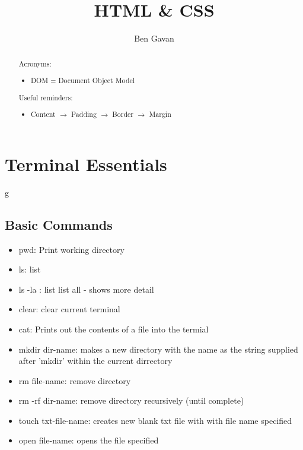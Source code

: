 \documentclass[]{article}
\title{HTML \& CSS}
\author{Ben Gavan}
\newcommand{\<}{\guilsinglleft}
\renewcommand{\>}{\guilsinglright}
\begin{document}
\maketitle

\tableofcontents

\begin{abstract}
Acronyms:
\begin{itemize}
	\item DOM = Document Object Model
\end{itemize} 
Useful reminders:
\begin{itemize}
	\item Content $\rightarrow$ Padding $\rightarrow$ Border $\rightarrow$ Margin 
\end{itemize}
\end{abstract}

\section{Terminal Essentials}g
\subsection{Basic Commands}
\begin{itemize}
	\item pwd: Print working directory 
	\item ls: list
	\item ls -la : list list all - shows more detail 
	\item clear: clear current terminal
	\item cat: Prints out the contents of a file into the termial 
	\item mkdir dir-name: makes a new directory with the name as the string supplied after 'mkdir'  within the current dirrectory 
	\item rm file-name: remove directory 
	\item rm -rf dir-name: remove directory recursively (until complete)
	\item touch txt-file-name: creates new blank txt file with with file name specified
	\item open file-name: opens the file specified
	
\end{itemize}
\end{document}
